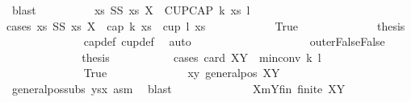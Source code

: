 \begin{isabellebody}
\ blast\isanewline
\isanewline
\ \ \ \ \ \ \ \ \isamarkupfalse%
\ {\isachardoublequoteopen}{\isasymexists}xs{\isachardot}{\kern0pt}\ {\isacharquery}{\kern0pt}SS\ xs\ X\ {\isasymand}\ {\isacharquery}{\kern0pt}CUPCAP\ k\ xs\ l{\isachardoublequoteclose}\isanewline
\ \ \ \ \ \ \ \ \isamarkupfalse%
{\isacharparenleft}{\kern0pt}cases\ {\isachardoublequoteopen}{\isasymexists}xs{\isachardot}{\kern0pt}\ {\isacharquery}{\kern0pt}SS\ xs\ X\ {\isasymand}\ {\isacharparenleft}{\kern0pt}cap\ k\ xs\ {\isasymor}\ cup\ l\ xs{\isacharparenright}{\kern0pt}{\isachardoublequoteclose}{\isacharparenright}{\kern0pt}\isanewline
\ \ \ \ \ \ \ \ \ \ \isamarkupfalse%
\ True\isanewline
\ \ \ \ \ \ \ \ \ \ \isamarkupfalse%
\ \isamarkupfalse%
\ {\isacharquery}{\kern0pt}thesis\isanewline
\ \ \ \ \ \ \ \ \ \ \ \ \isamarkupfalse%
\ cap{\isacharunderscore}{\kern0pt}def\ cup{\isacharunderscore}{\kern0pt}def\ \isamarkupfalse%
\ auto\isanewline
\ \ \ \ \ \ \ \ \isamarkupfalse%
\isanewline
\ \ \ \ \ \ \ \ \ \ \isamarkupfalse%
\ outerFalse{\isacharcolon}{\kern0pt}False\isanewline
\ \ \ \ \ \ \ \ \ \ \isamarkupfalse%
\ \isamarkupfalse%
\ {\isacharquery}{\kern0pt}thesis\isanewline
\ \ \ \ \ \ \ \ \ \ \isamarkupfalse%
{\isacharparenleft}{\kern0pt}cases\ {\isachardoublequoteopen}card\ {\isacharparenleft}{\kern0pt}X{\isacharminus}{\kern0pt}Y{\isacharparenright}{\kern0pt}\ {\isasymge}\ min{\isacharunderscore}{\kern0pt}conv\ k\ {\isacharparenleft}{\kern0pt}l{\isacharminus}{\kern0pt}{}{\isacharparenright}{\kern0pt}{\isachardoublequoteclose}{\isacharparenright}{\kern0pt}\isanewline
\ \ \ \ \ \isanewline
\ \ \ \ \ \ \ \ \ \ \ \ \isamarkupfalse%
\ True\isanewline
\ \ \ \ \ \ \ \ \ \ \ \ \isamarkupfalse%
\ xy{}{\isacharcolon}{\kern0pt}\ {\isachardoublequoteopen}general{\isacharunderscore}{\kern0pt}pos\ {\isacharparenleft}{\kern0pt}X{\isacharminus}{\kern0pt}Y{\isacharparenright}{\kern0pt}{\isachardoublequoteclose}\ \isamarkupfalse%
\ general{\isacharunderscore}{\kern0pt}pos{\isacharunderscore}{\kern0pt}subs\ ysx\ asm{\isacharparenleft}{\kern0pt}{}{\isacharparenright}{\kern0pt}\ \isamarkupfalse%
\ blast\isanewline
\ \ \ \ \ \ \ \ \ \ \ \ \isamarkupfalse%
\ XmY{\isacharunderscore}{\kern0pt}fin{\isacharcolon}{\kern0pt}\ {\isachardoublequoteopen}finite\ {\isacharparenleft}{\kern0pt}X{\isacharminus}{\kern0pt}Y{\isacharparenright}{\kern0pt}{\isachardoublequoteclose}\ \isamarkupfalse%

\end{isabellebody}
